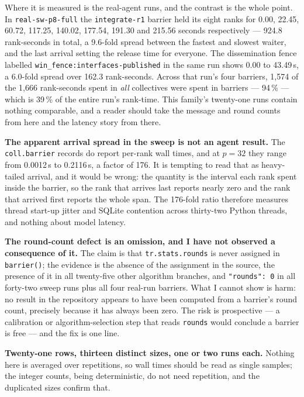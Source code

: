 \documentclass[11pt]{article}
\begin{document}
Where it is measured is the real-agent runs, and the contrast is the whole point. In
\texttt{real-sw-p8-full} the \texttt{integrate-r1} barrier held its eight ranks for 0.00, 22.45,
60.72, 117.25, 140.02, 177.54, 191.30 and 215.56 seconds respectively --- 924.8 rank-seconds
in total, a 9.6-fold spread between the fastest and slowest waiter, and the last arrival setting
the release time for everyone. The dissemination fence labelled
\texttt{win\_fence:interfaces-published} in the same run shows 0.00 to 43.49\,s, a 6.0-fold
spread over 162.3 rank-seconds. Across that run's four barriers, 1,574 of the 1,666 rank-seconds
spent in \emph{all} collectives were spent in barriers --- 94\,\% --- which is 39\,\% of the
entire run's rank-time. This family's twenty-one runs contain nothing comparable, and a reader
should take the message and round counts from here and the latency story from there.

\textbf{The apparent arrival spread in the sweep is not an agent result.} The
\texttt{coll.barrier} records do report per-rank wall times, and at $p=32$ they range from
0.0012\,s to 0.2116\,s, a factor of 176. It is tempting to read that as heavy-tailed arrival,
and it would be wrong: the quantity is the interval each rank spent inside the barrier, so the
rank that arrives last reports nearly zero and the rank that arrived first reports the whole
span. The 176-fold ratio therefore measures thread start-up jitter and SQLite contention across
thirty-two Python threads, and nothing about model latency.

\textbf{The round-count defect is an omission, and I have not observed a consequence of it.}
The claim is that \texttt{tr.stats.rounds} is never assigned in \texttt{barrier()}; the evidence
is the absence of the assignment in the source, the presence of it in all twenty-five other
algorithm branches, and \texttt{"rounds": 0} in all forty-two sweep runs plus all four real-run
barriers. What I cannot show is harm: no result in the repository appears to have been computed
from a barrier's round count, precisely because it has always been zero. The risk is
prospective --- a calibration or algorithm-selection step that reads \texttt{rounds} would
conclude a barrier is free --- and the fix is one line.

\textbf{Twenty-one rows, thirteen distinct sizes, one or two runs each.} Nothing here is
averaged over repetitions, so wall times should be read as single samples; the integer counts,
being deterministic, do not need repetition, and the duplicated sizes confirm that.
\end{document}
